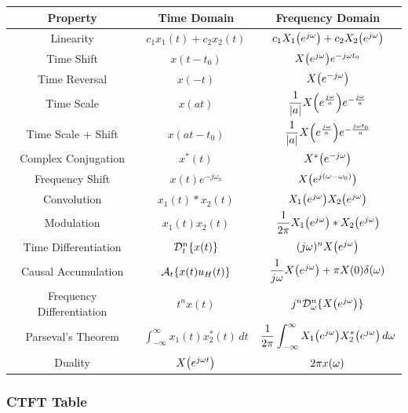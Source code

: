\documentclass[11pt]{article}
\begin{document}
  \bgroup
  \renewcommand{\arraystretch}{2.1}
  \setlength{\tabcolsep}{0.55cm}
  \large\begin{tabular}{c|c|c}
    Property & Time Domain & Frequency Domain \\
    \toprule
    Linearity & \(c_1x_1(t) + c_2x_2(t)\) & \(c_1X_1{\left( e^{j\omega} \right)} + c_2X_2{\left( e^{j\omega} \right)}\) \\
    Time Shift & \(x(t - t_0)\) & \(X{\left( e^{j\omega} \right)}e^{-j\omega t_0}\)\\
    Time Reversal & \(x(-t)\) & \(X{\left( e^{-j\omega} \right)}\)\\
    Time Scale & \(x(at)\) & \(\dfrac{1}{|a|}X{\left( e^{\frac{j\omega}{a}} \right)}e^{-\frac{j\omega}{a}}\)\\
    Time Scale + Shift & \(x(at - t_0)\) & \(\dfrac{1}{|a|}X{\left( e^{\frac{j\omega}{a}} \right)}e^{-\frac{j\omega t_0}{a}}\)\\
    Complex Conjugation & \(x^*(t)\) & \(X^*{\left( e^{-j\omega} \right)}\)\\
    Frequency Shift & \(x(t)e^{-j\omega_0}\) & \(X{\left( e^{j(\omega - \omega_0)} \right)}\)\\
    Convolution & \(x_1(t) * x_2(t)\) & \(X_1{\left( e^{j\omega} \right)}X_2{\left( e^{j\omega} \right)}\) \\
    Modulation & \(x_1(t)x_2(t)\) & \(\dfrac{1}{2\pi}X_1{\left( e^{j\omega} \right)} * X_2{\left( e^{j\omega} \right)}\) \\
    Time Differentiation & \(\mathcal{D}_t^n\{x(t)\}\) & \((j\omega)^nX{\left( e^{j\omega} \right)}\) \\
    Causal Accumulation &
    \(\mathcal{A}_t\{x(t)u_H(t)\}\) & \(\dfrac{1}{j\omega}X{\left( e^{j\omega} \right)} + \pi X(0)\delta(\omega)\) \\
    Frequency Differentiation & \(t^n x(t)\) & \(j^n\mathcal{D}_{\omega}^n\{X{\left( e^{j\omega} \right)}\}\) \\
    Parseval's Theorem & \(\displaystyle\int_{-\infty}^{\infty} x_1(t)x^*_2(t)\,dt \) &
    \(\dfrac{1}{2\pi}\displaystyle\int_{-\infty}^{\infty} X_1{\left( e^{j\omega} \right)}X_2^*{\left( e^{j\omega} \right)} \,d\omega\) \\
    Duality & \(X{\left( e^{j\omega t} \right)}\) & \(2\pi x{\left( \omega \right)}\)
  \end{tabular}
  \egroup

  \pagebreak

  \subsubsection{CTFT Table}
\end{document}
